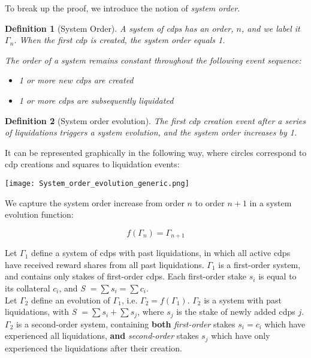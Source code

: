 \documentclass[reqno]{article}
\newtheorem{definition}{Definition}[section]
\begin{document}
To break up the proof, we introduce the notion of \textit{system order}. 

\begin{definition}[System Order]
  A system of cdps has an order, $n$, and we label it $\Gamma_n$. When the first cdp is created, the system order equals 1.

  The order of a system remains constant throughout the following event sequence:

\begin{itemize}
  \item 1 or more new cdps are created 
  \item 1 or more cdps are subsequently liquidated
\end{itemize}
\end{definition}

\begin{definition}[System order evolution]
  The first cdp creation event after a series of liquidations triggers a system evolution, and the system order increases by 1.
\end{definition}

It can be represented graphically in the following way, where circles correspond to cdp creations and squares to liquidation events:

\texttt{[image: System\_order\_evolution\_generic.png]}

We capture the system order increase from order $n$ to order $n+1$  in a system evolution function:

\begin{equation} 
    f(\Gamma_n)=\Gamma_{n+1}
\end{equation}

\bigskip
Let $\Gamma_1$ define a system of cdps with past liquidations, in which all active cdps have received reward shares from all past liquidations. $\Gamma_1$ is a first-order system, and contains only stakes of first-order cdps. Each first-order stake $s_i$ is equal to its collateral $c_i$, and \textit{S} $= \sum s_i = \sum c_i$.\\

Let $\Gamma_2$ define an evolution of $\Gamma_1$, i.e. $\Gamma_2 = f(\Gamma_1)$. $\Gamma_2$ is a system with past liquidations, with \textit{S} $= \sum s_i + \sum s_j$, where $s_j$ is the stake of newly added cdps $j$. $\Gamma_2$ is a second-order system, containing \textbf{both} \textit{first-order} stakes $s_i = c_i$ which have experienced all liquidations, \textbf{and} \textit{second-order} stakes $s_j$ which have only experienced the liquidations after their creation.\\
\end{document}
